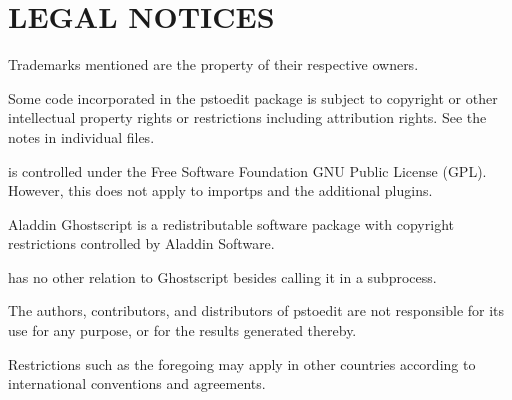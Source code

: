 \documentclass[english,a4paper]{article}
\begin{document}
\section{LEGAL NOTICES}

Trademarks mentioned are the property of their respective owners.

Some code incorporated in the pstoedit package is subject to copyright or
other intellectual property rights or restrictions including attribution
rights. See the notes in individual files.

 is controlled under the Free Software Foundation GNU Public
License (GPL). However, this does not apply to importps and the additional
plugins.

Aladdin Ghostscript is a redistributable software package with copyright
restrictions controlled by Aladdin Software.

 has no other relation to Ghostscript besides calling it in a
subprocess.

The authors, contributors, and distributors of pstoedit are not responsible
for its use for any purpose, or for the results generated thereby.

Restrictions such as the foregoing may apply in other countries according to
international conventions and agreements.


\LatexManEnd
\end{document}
